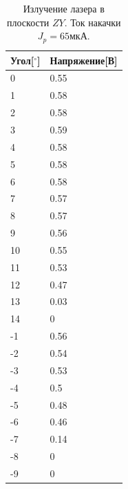 \documentclass[a4paper, 12pt]{extarticle}
\begin{document}
\begin{table}[htbp]
    
\begin{center}

    \begin{tabular}{|l|l|}
        \hline
    Угол[$^{\circ}$]&Напряжение[В]\\
    \hline
    0&0.55\\
    1&0.58\\
    2&0.58\\
    3&0.59\\
    4&0.58\\
    5&0.58\\
    6&0.58\\
    7&0.57\\
    8&0.57\\
    9&0.56\\
    10&0.55\\
    11&0.53\\
    12&0.47\\
    13&0.03\\
    14&0\\
    -1&0.56\\
    -2&0.54\\
    -3&0.53\\
    -4&0.5\\
    -5&0.48\\
    -6&0.46\\
    -7&0.14\\
    -8&0\\
    -9&0\\
    \hline

    \end{tabular}
\end{center}
\caption{Излучение лазера в плоскости $ZY$. Ток накачки $J_p = 65\text{мкА}$.}
\label{tab:ZY_65}
\end{table}
\end{document}
